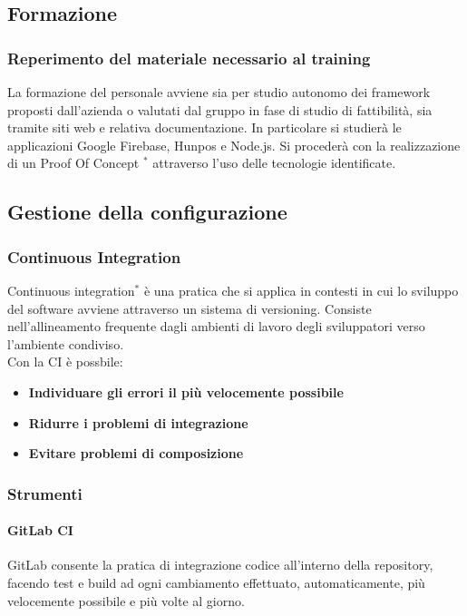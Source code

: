 \documentclass[11pt,a4paper]{article}
\begin{document}
{	\subsection{Formazione}
	\subsubsection{Reperimento del materiale necessario al training}
	La formazione del personale avviene sia per studio autonomo dei framework proposti dall’azienda o valutati dal gruppo in fase di studio di fattibilità, sia tramite siti web e relativa documentazione. In particolare si studierà le applicazioni Google Firebase, Hunpos e Node.js. Si procederà con la realizzazione di un Proof Of Concept $^*$ attraverso l’uso delle tecnologie identificate.
	\\
\subsection{Gestione della configurazione}
\subsubsection{Continuous Integration}
Continuous integration$^*$ è una pratica che si applica in contesti in cui lo sviluppo del software avviene attraverso un sistema di versioning. Consiste nell'allineamento frequente dagli ambienti di lavoro degli sviluppatori verso l'ambiente condiviso. \\
Con la CI è possbile:
\begin{itemize}
	\item \textbf{Individuare gli errori il più velocemente possibile}
	\item \textbf{Ridurre i problemi di integrazione}
	\item \textbf{Evitare problemi di composizione} 
\end{itemize}
\subsubsection{Strumenti}
\paragraph{GitLab CI\\}
GitLab consente la pratica di integrazione codice all'interno della repository, facendo test e build ad ogni cambiamento effettuato, automaticamente, più velocemente possibile e più volte al giorno.

}
\end{document}
